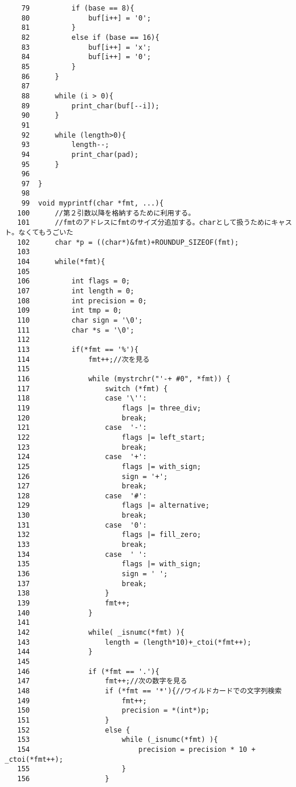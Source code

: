 \documentclass[a4j,11pt]{jarticle}
\begin{document}
\begin{verbatim}
    79	        if (base == 8){
    80	            buf[i++] = '0';
    81	        }
    82	        else if (base == 16){
    83	            buf[i++] = 'x';
    84	            buf[i++] = '0';
    85	        }
    86	    }
    87	
    88	    while (i > 0){ 
    89	        print_char(buf[--i]);      
    90	    }
    91	
    92	    while (length>0){
    93	        length--; 
    94	        print_char(pad);
    95	    }
    96	
    97	}
    98	
    99	void myprintf(char *fmt, ...){
   100	    //第２引数以降を格納するために利用する。
   101	    //fmtのアドレスにfmtのサイズ分追加する。charとして扱うためにキャスト。なくてもうごいた
   102	    char *p = ((char*)&fmt)+ROUNDUP_SIZEOF(fmt);
   103	
   104	    while(*fmt){
   105	
   106	        int flags = 0;
   107	        int length = 0;
   108	        int precision = 0;
   109	        int tmp = 0;
   110	        char sign = '\0';
   111	        char *s = '\0';
   112	
   113	        if(*fmt == '%'){
   114	            fmt++;//次を見る
   115	
   116	            while (mystrchr("'-+ #0", *fmt)) {
   117	                switch (*fmt) {
   118	                case '\'': 
   119	                    flags |= three_div;             
   120	                    break;
   121	                case  '-': 
   122	                    flags |= left_start;             
   123	                    break;
   124	                case  '+': 
   125	                    flags |= with_sign; 
   126	                    sign = '+'; 
   127	                    break;
   128	                case  '#': 
   129	                    flags |= alternative;                
   130	                    break;
   131	                case  '0': 
   132	                    flags |= fill_zero;               
   133	                    break;
   134	                case  ' ': 
   135	                    flags |= with_sign; 
   136	                    sign = ' '; 
   137	                    break;
   138	                }
   139	                fmt++;
   140	            }
   141	
   142	            while( _isnumc(*fmt) ){
   143	                length = (length*10)+_ctoi(*fmt++);
   144	            }
   145	
   146	            if (*fmt == '.'){
   147	                fmt++;//次の数字を見る
   148	                if (*fmt == '*'){//ワイルドカードでの文字列検索
   149	                    fmt++;
   150	                    precision = *(int*)p;
   151	                }
   152	                else { 
   153	                    while (_isnumc(*fmt) ){
   154	                        precision = precision * 10 + _ctoi(*fmt++);
   155	                    }
   156	                }

\end{verbatim}
\end{document}
